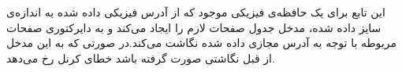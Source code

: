 این تابع برای یک حافظه‌ی فیزیکی موجود که از آدرس فیزیکی داده شده به اندازه‌ی سایز داده شده، مدخل جدول صفحات لازم را ایجاد می‌کند و به دایرکتوری صفحات مربوطه با توجه به آدرس مجازی داده شده نگاشت می‌کند.در صورتی که به این مدخل از قبل نگاشتی صورت گرفته باشد خطای کرنل رخ می‌دهد.
